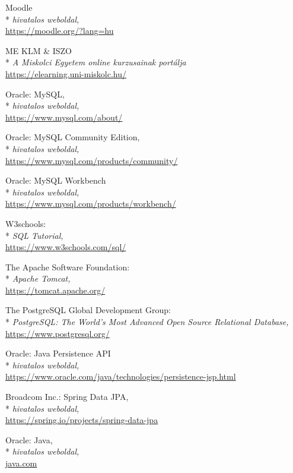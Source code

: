 \begin{thebibliography}{x}
 Moodle\\*
\textit{hivatalos weboldal,}
\\ \url{https://moodle.org/?lang=hu}

 ME KLM \& ISZO\\*
\textit{A Miskolci Egyetem online kurzusainak portálja}
\\ \url{https://elearning.uni-miskolc.hu/}

 Oracle: MySQL,\\*
\textit{hivatalos weboldal,}
\\ \url{https://www.mysql.com/about/}

 Oracle: MySQL Community Edition,\\*
\textit{hivatalos weboldal,}
\\ \url{https://www.mysql.com/products/community/}

 Oracle: MySQL Workbench\\*
\textit{hivatalos weboldal,}
\\ \url{https://www.mysql.com/products/workbench/}

 W3schools:\\*
\textit{SQL Tutorial,}
\\ \url{https://www.w3schools.com/sql/}

 The Apache Software Foundation: \\*
\textit{Apache Tomcat,}
\\ \url{https://tomcat.apache.org/}

 The PostgreSQL Global Development Group:\\*
\textit{PostgreSQL: The World's Most Advanced Open Source Relational Database,}
\\ \url{https://www.postgresql.org/}

 Oracle: Java Persistence API\\*
\textit{hivatalos weboldal,}
\\ \url{https://www.oracle.com/java/technologies/persistence-jsp.html}

 Broadcom Inc.: Spring Data JPA,\\*
\textit{hivatalos weboldal,}
\\ \url{https://spring.io/projects/spring-data-jpa}

 Oracle: Java,\\*
\textit{hivatalos weboldal,}
\\ \url{java.com}


\end{thebibliography}
